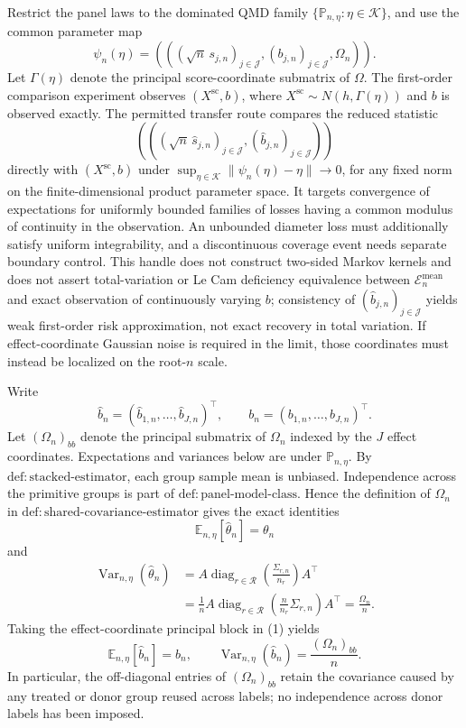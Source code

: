 Restrict the panel laws to the dominated QMD family \(\{\mathbb P_{n,\eta}:\eta\in\mathcal K\}\), and use the common parameter map
\[
 \psi_n(\eta)=
 \left(((\sqrt n\,s_{j,n})_{j\in\mathcal J},
        (b_{j,n})_{j\in\mathcal J},\Omega_n)\right).
\]
Let \(\Gamma(\eta)\) denote the principal score-coordinate submatrix of \(\Omega\). The first-order comparison experiment observes \((X^{\mathrm{sc}},b)\), where \(X^{\mathrm{sc}}\sim N(h,\Gamma(\eta))\) and \(b\) is observed exactly. The permitted transfer route compares the reduced statistic
\[
 \left(((\sqrt n\,\widehat s_{j,n})_{j\in\mathcal J},
        (\widehat b_{j,n})_{j\in\mathcal J})\right)
\]
directly with \((X^{\mathrm{sc}},b)\) under \(\sup_{\eta\in\mathcal K}\lVert\psi_n(\eta)-\eta\rVert\to0\), for any fixed norm on the finite-dimensional product parameter space. It targets convergence of expectations for uniformly bounded families of losses having a common modulus of continuity in the observation. An unbounded diameter loss must additionally satisfy uniform integrability, and a discontinuous coverage event needs separate boundary control. This handle does not construct two-sided Markov kernels and does not assert total-variation or Le Cam deficiency equivalence between \(\mathcal E_n^{\mathrm{mean}}\) and exact observation of continuously varying \(b\); consistency of \((\widehat b_{j,n})_{j\in\mathcal J}\) yields weak first-order risk approximation, not exact recovery in total variation. If effect-coordinate Gaussian noise is required in the limit, those coordinates must instead be localized on the root-\(n\) scale.

Write
\[
 \widehat b_n=(\widehat b_{1,n},\ldots,\widehat b_{J,n})^{\top},
 \qquad
 b_n=(b_{1,n},\ldots,b_{J,n})^{\top}.
\]
Let \((\Omega_n)_{bb}\) denote the principal submatrix of \(\Omega_n\) indexed by the \(J\) effect coordinates. Expectations and variances below are under \(\mathbb P_{n,\eta}\). By \(\mathrm{def:stacked\text{-}estimator}\), each group sample mean is unbiased. Independence across the primitive groups is part of \(\mathrm{def:panel\text{-}model\text{-}class}\). Hence the definition of \(\Omega_n\) in \(\mathrm{def:shared\text{-}covariance\text{-}estimator}\) gives the exact identities
\[
 \mathbb E_{n,\eta}[\widehat\theta_n]=\theta_n
\]
and
\[
 \begin{aligned}
 \operatorname{Var}_{n,\eta}(\widehat\theta_n)
 &=A\operatorname{diag}_{r\in\mathcal R}
   \left(\frac{\Sigma_{r,n}}{n_r}\right)A^{\top}\\
 &=\frac1n A\operatorname{diag}_{r\in\mathcal R}
   \left(\frac n{n_r}\Sigma_{r,n}\right)A^{\top}
 =\frac{\Omega_n}{n}.
 \end{aligned}
 \tag{1}
\]
Taking the effect-coordinate principal block in (1) yields
\[
 \mathbb E_{n,\eta}[\widehat b_n]=b_n,
 \qquad
 \operatorname{Var}_{n,\eta}(\widehat b_n)
 =\frac{(\Omega_n)_{bb}}{n}.
 \tag{2}
\]
In particular, the off-diagonal entries of \((\Omega_n)_{bb}\) retain the covariance caused by any treated or donor group reused across labels; no independence across donor labels has been imposed.

